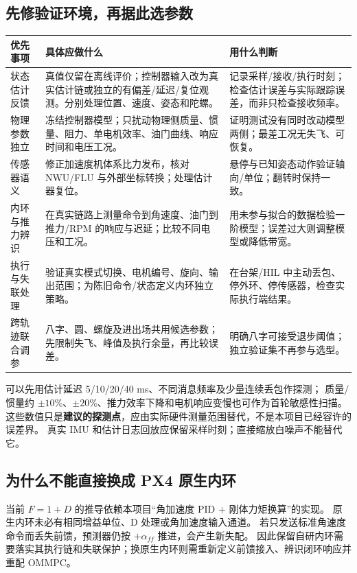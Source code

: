 \documentclass[UTF8,a4paper,11pt,fontset=fandol]{ctexart}
\begin{document}
\subsection{先修验证环境，再据此选参数}
\begin{longtable}{L{2.9cm}L{7.2cm}L{5.1cm}}
\toprule 优先事项 & 具体应做什么 & 用什么判断\\\midrule\endhead
状态估计反馈 & 真值仅留在离线评价；控制器输入改为真实估计链或独立的有偏差/延迟/复位观测。分别处理位置、速度、姿态和陀螺。 & 记录采样/接收/执行时刻；检查估计误差与实际跟踪误差，而非只检查接收频率。\\
物理参数独立 & 冻结控制器模型；只扰动物理侧质量、惯量、阻力、单电机效率、油门曲线、响应时间和电压工况。 & 证明测试没有同时改动模型两侧；最差工况无失飞、可恢复。\\
传感器语义 & 修正加速度机体系比力发布，核对 NWU/FLU 与外部坐标转换；处理估计器复位。 & 悬停与已知姿态动作验证轴向/单位；翻转时保持一致。\\
内环与推力辨识 & 在真实链路上测量命令到角速度、油门到推力/RPM 的响应与迟延；比较不同电压和工况。 & 用未参与拟合的数据检验一阶模型；误差过大则调整模型或降低带宽。\\
执行与失联处理 & 验证真实模式切换、电机编号、旋向、输出范围；为陈旧命令/状态定义内环独立策略。 & 在台架/HIL 中主动丢包、停外环、停传感器，检查实际执行端结果。\\
跨轨迹联合调参 & 八字、圆、螺旋及进出场共用候选参数；先限制失飞、峰值及执行余量，再比较误差。 & 明确八字可接受退步阈值；独立验证集不再参与选型。\\
\bottomrule
\end{longtable}

可以先用估计延迟 5/10/20/40 ms、不同消息频率及少量连续丢包作探测；
质量/惯量约 $\pm10\%$、$\pm20\%$、推力效率下降和电机响应变慢也可作为首轮敏感性扫描。
这些数值只是\textbf{建议的探测点}，应由实际硬件测量范围替代，不是本项目已经容许的误差界。
真实 IMU 和估计日志回放应保留采样时刻；直接缩放白噪声不能替代它。

\subsection{为什么不能直接换成 PX4 原生内环}
当前 $F=1+D$ 的推导依赖本项目“角加速度 PID + 刚体力矩换算”的实现。
原生内环未必有相同增益单位、D 处理或角加速度输入通道。
若只发送标准角速度命令而丢失前馈，预测器仍按 $+\alpha_{ff}$ 推进，会产生新失配。
因此保留自研内环需要落实其执行链和失联保护；换原生内环则需重新定义前馈接入、辨识闭环响应并重配 OMMPC。
\end{document}

